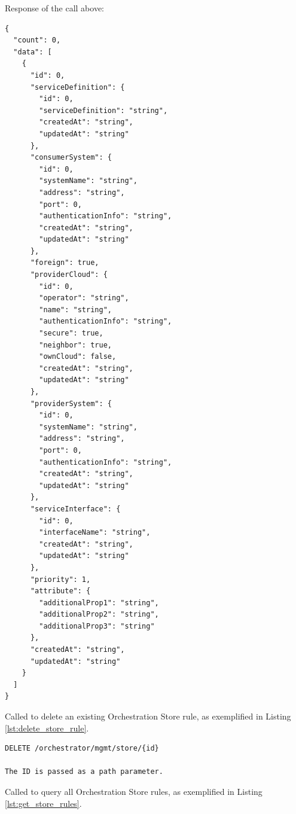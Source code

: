 \documentclass[a4paper]{arrowhead}
\newcommand{\fref}[1]{{\textcolor{ArrowheadBlue}{\hyperref[sec:functions:#1]{#1}}}}
\begin{document}
Response of the call above:

\begin{lstlisting}[language=http,label={lst:add:store_entries_list},caption={An \fref{Add Store Entries} response is a StoreEntryList}]
{
  "count": 0,
  "data": [
    {
      "id": 0,
      "serviceDefinition": {
        "id": 0,
        "serviceDefinition": "string",
        "createdAt": "string",
        "updatedAt": "string"
      },
      "consumerSystem": {
        "id": 0,
        "systemName": "string",
        "address": "string",
        "port": 0,
        "authenticationInfo": "string",
        "createdAt": "string",
        "updatedAt": "string"
      },
      "foreign": true,
      "providerCloud": {
        "id": 0,
        "operator": "string",
        "name": "string",
        "authenticationInfo": "string",
        "secure": true,
        "neighbor": true,
        "ownCloud": false,
        "createdAt": "string",
        "updatedAt": "string"
      },
      "providerSystem": {
        "id": 0,
        "systemName": "string",
        "address": "string",
        "port": 0,
        "authenticationInfo": "string",
        "createdAt": "string",
        "updatedAt": "string"
      },
      "serviceInterface": {
        "id": 0,
        "interfaceName": "string",
        "createdAt": "string",
        "updatedAt": "string"
      },
      "priority": 1,
      "attribute": {
        "additionalProp1": "string",
        "additionalProp2": "string",
        "additionalProp3": "string"
      },
      "createdAt": "string",
      "updatedAt": "string"
    }
  ]
}

\end{lstlisting}


Called to delete an existing Orchestration Store rule, as exemplified in Listing \ref{lst:delete_store_rule}.

\begin{lstlisting}[language=http,label={lst:delete_store_rule},caption={A \fref{Delete Store Entry by ID} invocation.}]
DELETE /orchestrator/mgmt/store/{id}

The ID is passed as a path parameter.
\end{lstlisting}



Called to query all Orchestration Store rules, as exemplified in Listing \ref{lst:get_store_rules}.
\end{document}

